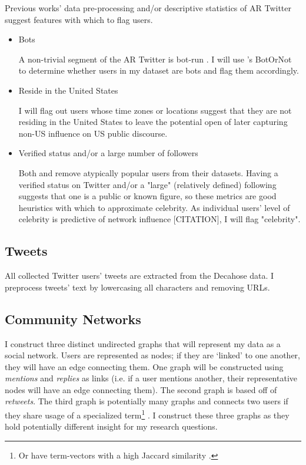 \documentclass[acmlarge, screen, authorversion]{acmart}
\begin{document}
    Previous works' \cite{bergerAltrightTwitterCensus2018, alizadehPsychologyMoralityPolitical2019} data pre-processing and/or descriptive statistics of AR Twitter suggest features with which to flag users.
    
    \begin{itemize}
        \item Bots
        
            A non-trivial segment of the AR Twitter is bot-run \cite{bergerAltrightTwitterCensus2018}. I will use \citet{davisBotOrNotSystemEvaluate2016}'s BotOrNot to determine whether users in my dataset are bots and flag them accordingly.
            
        \item Reside in the United States
        
            I will flag out users whose time zones or locations suggest that they are not residing in the United States to leave the potential open of later capturing non-US influence on US public discourse.
        
        \item Verified status and/or a large number of followers
            
            Both \citet{bergerAltrightTwitterCensus2018} and \citet{alizadehPsychologyMoralityPolitical2019} remove atypically popular users from their datasets. Having a verified status on Twitter and/or a "large" (relatively defined) following suggests that one is a public or known figure, so these metrics are good heuristics with which to approximate celebrity. As individual users' level of celebrity is predictive of network influence [CITATION], I will flag "celebrity".
        
    \end{itemize}
    
\subsection{Tweets}

    All collected Twitter users' tweets are extracted from the Decahose data. I preprocess tweets' text by lowercasing all characters and removing URLs. 
    
\subsection{Community Networks}

I construct three distinct undirected graphs that will represent my data as a social network. Users are represented as nodes; if they are `linked' to one another, they will have an edge connecting them. One graph will be constructed using \textit{mentions} and \textit{replies} as links (i.e. if a user mentions another, their representative nodes will have an edge connecting them). The second graph is based off of \textit{retweets}. The third graph is potentially many graphs and connects two users if they share usage of a specialized term\footnote{Or have term-vectors with a high Jaccard similarity \cite{niwattanakulUsingJaccardCoefficient2013}.} . I construct these three graphs as they hold potentially different insight for my research questions. 
\end{document}

